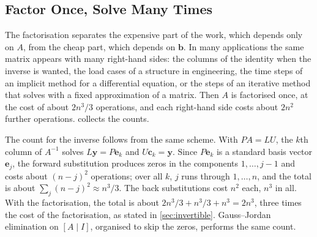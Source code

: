\subsection{Factor Once, Solve Many Times}

The factorisation separates the expensive part of the work, which depends only on $A$, from the cheap part, which depends on $\mathbf b$. In many applications the same matrix appears with many right-hand sides: the columns of the identity when the inverse is wanted, the load cases of a structure in engineering, the time steps of an implicit method for a differential equation, or the steps of an iterative method that solves with a fixed approximation of a matrix. Then $A$ is factorised once, at the cost of about $2n^3/3$ operations, and each right-hand side costs about $2n^2$ further operations.  collects the counts.

\begin{table}
\end{table}

The count for the inverse follows from the same scheme. With $PA=LU$, the $k$th column of $A^{-1}$ solves $L\mathbf y=P\mathbf e_k$ and $U\mathbf c_k=\mathbf y$. Since $P\mathbf e_k$ is a standard basis vector $\mathbf e_j$, the forward substitution produces zeros in the components $1,\ldots,j-1$ and costs about $(n-j)^2$ operations; over all $k$, $j$ runs through $1,\ldots,n$, and the total is about $\sum_j(n-j)^2\approx n^3/3$. The back substitutions cost $n^2$ each, $n^3$ in all. With the factorisation, the total is about $2n^3/3+n^3/3+n^3=2n^3$, three times the cost of the factorisation, as stated in \cref{sec:invertible}. Gauss--Jordan elimination on $[A\mid I]$, organised to skip the zeros, performs the same count.

